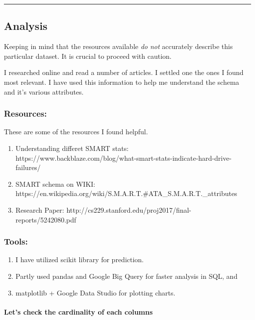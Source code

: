 \documentclass[11pt]{article}
\providecommand{\tightlist}{%
      \setlength{\itemsep}{0pt}\setlength{\parskip}{0pt}}
\begin{document}
    \begin{center}\rule{0.5\linewidth}{\linethickness}\end{center}

\subsection{Analysis}\label{analysis}

Keeping in mind that the resources available \emph{do not} accurately
describe this particular dataset. It is crucial to proceed with caution.

I researched online and read a number of articles. I settled one the
ones I found most relevant. I have used this information to help me
understand the schema and it's various attributes.

\subsubsection{Resources:}\label{resources}

These are some of the resources I found helpful.

\begin{enumerate}
\def\labelenumi{\arabic{enumi}.}
\tightlist
\item
  Understanding differet SMART stats:
  https://www.backblaze.com/blog/what-smart-stats-indicate-hard-drive-failures/
\item
  SMART schema on WIKI:
  https://en.wikipedia.org/wiki/S.M.A.R.T.\#ATA\_S.M.A.R.T.\_attributes
\item
  Research Paper:
  http://cs229.stanford.edu/proj2017/final-reports/5242080.pdf
\end{enumerate}

\subsubsection{Tools:}\label{tools}

\begin{enumerate}
\def\labelenumi{\arabic{enumi}.}
\tightlist
\item
  I have utilized scikit library for prediction.
\item
  Partly used pandas and Google Big Query for faster analysis in SQL,
  and
\item
  matplotlib + Google Data Studio for plotting charts.
\end{enumerate}

    \paragraph{Let's check the cardinality of each
columns}\label{lets-check-the-cardinality-of-each-columns}
\end{document}
